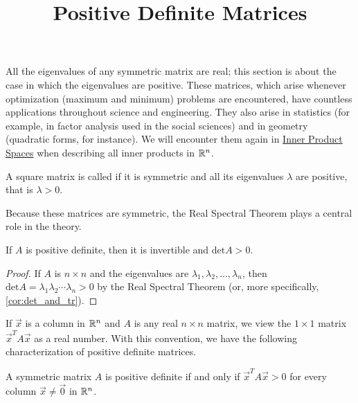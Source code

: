 \documentclass{ximera}
\title{Positive Definite Matrices} \license{CC BY-NC-SA 4.0}
\begin{document}
\begin{abstract}

\end{abstract}
\maketitle

All the eigenvalues of any symmetric
matrix are real; this section is about the case in which the eigenvalues
 are positive. These matrices, which arise whenever optimization
(maximum and minimum) problems are encountered, have countless
applications throughout science and engineering. They also arise in
statistics (for example, in factor analysis used in the social sciences)
 and in geometry (quadratic forms, for instance). We will encounter them again in \href{}{Inner Product Spaces} when describing all inner products in $\mathbb{R}^n$.


\begin{definition}\label{024811}
A square matrix is called  if it is symmetric and all its eigenvalues $\lambda$ are positive, that is $\lambda > 0$.
\end{definition}

Because these matrices are symmetric, the Real Spectral Theorem plays a central role in the theory.


\begin{theorem}\label{thm:024815}
If $A$ is positive definite, then it is invertible and $\mbox{det}A > 0$.
\end{theorem}

\begin{proof}
If $A$ is $n \times n$ and the eigenvalues are $\lambda_{1}, \lambda_{2}, \dots, \lambda_{n}$, then $\mbox{det}A = \lambda_{1}\lambda_{2} \cdots \lambda_{n} > 0$ by the Real Spectral Theorem (or, more specifically, \ref{cor:det_and_tr}).
\end{proof}

If $\vec{x}$ is a column in $\mathbb{R}^n$ and $A$ is any real $n \times n$ matrix, we view the $1 \times 1$ matrix $\vec{x}^{T}A\vec{x}$ as a real number. With this convention, we have the following characterization of positive definite matrices.


\begin{theorem}\label{thm:024830}
A symmetric matrix $A$ is positive definite if and only if $\vec{x}^{T} A \vec{x} > 0$ for every column $\vec{x} \neq \vec{0}$ in $\mathbb{R}^n$.
\end{theorem}
\end{document}
